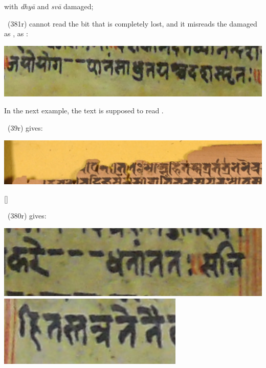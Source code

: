   
\smallskip

\noindent
with \textit{dhyā} and \textit{svā} damaged;

\medskip

\msL\ (\fol381r) cannot read the bit that 
is completely lost, and it misreads 
the damaged  as ,  as :
\smallskip

\includegraphics[scale=.3]{images/japoyoga_msL.png}

\bigskip
\bigskip

In the next example, the text is supposed to read
.

\msNa\ (\fol39r) gives:
\smallskip

\includegraphics[scale=.21]{images/hitas_msNa.png}

\hspace{2em}[] 
\medskip

\msL\ (\fol380r) gives:
\smallskip

\includegraphics[scale=.3]{images/hitas01_msL.png}
\includegraphics[scale=.3]{images/hitas02_msL.png}

